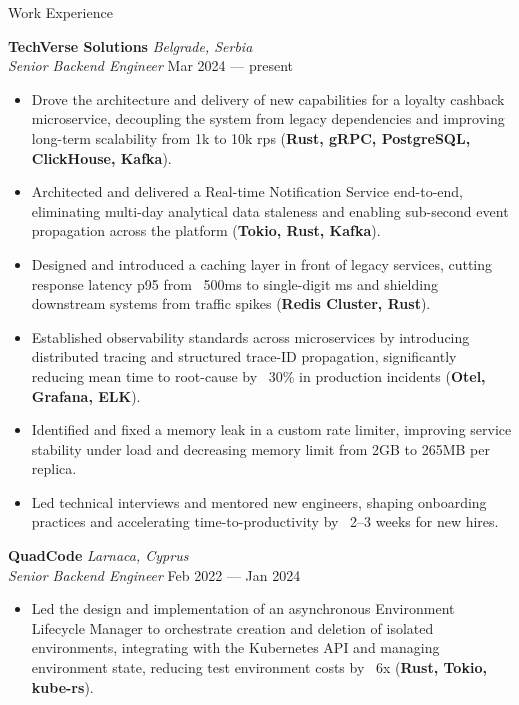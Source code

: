 \documentclass{resume} %
\begin{document}
\begin{rSection}{Work Experience}

\textbf{TechVerse Solutions} \hfill \textit{Belgrade, Serbia} \\
{\large \textit{Senior Backend Engineer}} \hfill Mar 2024 --- present
\begin{itemize}
\item Drove the architecture and delivery of new capabilities for a loyalty cashback microservice, decoupling the system from legacy dependencies and improving long-term scalability from 1k to 10k rps (\textbf{Rust, gRPC, PostgreSQL, ClickHouse, Kafka}).

\item Architected and delivered a Real-time Notification Service end-to-end, eliminating multi-day analytical data staleness and enabling sub-second event propagation across the platform (\textbf{Tokio, Rust, Kafka}).

\item Designed and introduced a caching layer in front of legacy services, cutting response latency p95 from ~500ms to single-digit ms and shielding downstream systems from traffic spikes (\textbf{Redis Cluster, Rust}).

\item Established observability standards across microservices by introducing distributed tracing and structured trace-ID propagation, significantly reducing mean time to root-cause by ~30\% in production incidents (\textbf{Otel, Grafana, ELK}).

\item Identified and fixed a memory leak in a custom rate limiter, improving service stability under load and decreasing memory limit from 2GB to 265MB per replica.

\item Led technical interviews and mentored new engineers, shaping onboarding practices and accelerating time-to-productivity by ~2–3 weeks for new hires.
\end{itemize}

\textbf{QuadCode} \hfill \textit{Larnaca, Cyprus} \\
{\large \textit{Senior Backend Engineer}} \hfill Feb 2022 --- Jan 2024
\begin{itemize}
\item Led the design and implementation of an asynchronous Environment Lifecycle Manager to orchestrate creation and deletion of isolated environments, integrating with the Kubernetes API and managing environment state, reducing test environment costs by ~6x (\textbf{Rust, Tokio, kube-rs}).


\end{itemize}
\end{rSection}
\end{document}
